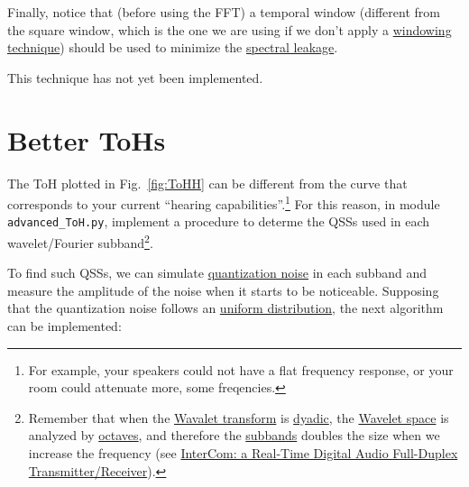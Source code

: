 Finally, notice that (before using the FFT) a temporal window
(different from the square window, which is the one we are using if
we don't apply a
\href{https://en.wikipedia.org/wiki/Window_function}{windowing
  technique}) should be used to minimize the
\href{https://en.wikipedia.org/wiki/Spectral_leakage}{spectral
  leakage}.

This technique has not yet been implemented.

\section{Better ToHs}
\label{sec:better_ToH}

The ToH plotted in Fig.~\ref{fig:ToHH} can be
different from the curve that corresponds to your current ``hearing
capabilities''.\footnote{For example, your speakers could not have a
  flat frequency response, or your room could attenuate more, some
  freqencies.} For this reason, in module \verb|advanced_ToH.py|,
implement a procedure to determe the QSSs used in
each wavelet/Fourier subband\footnote{Remember that when the
  \href{https://en.wikipedia.org/wiki/Wavelet_transform}{Wavalet
    transform} is
  \href{https://en.wikipedia.org/wiki/Dyadic_rational}{dyadic}, the
  \href{https://en.wikipedia.org/wiki/Discrete_wavelet_transform}{Wavelet
    space} is analyzed by
  \href{https://en.wikipedia.org/wiki/Octave_band}{octaves}, and
  therefore the
  \href{https://en.wikipedia.org/wiki/Filter_bank}{subbands} doubles
  the size when we increase the frequency (see \href{https://github.com/Tecnologias-multimedia/InterCom/blob/master/docs/2-hours_seminar.ipynb}{
  InterCom: a Real-Time Digital Audio Full-Duplex
  Transmitter/Receiver}).}.
  
To find such QSSs, we can simulate
\href{https://en.wikipedia.org/wiki/Quantization_(signal_processing)}{quantization
  noise} in each subband and measure the amplitude of the noise when
it starts to be noticeable. Supposing that the quantization noise
follows an
\href{https://en.wikipedia.org/wiki/Continuous_uniform_distribution}{uniform
  distribution}, the next algorithm can be implemented:

